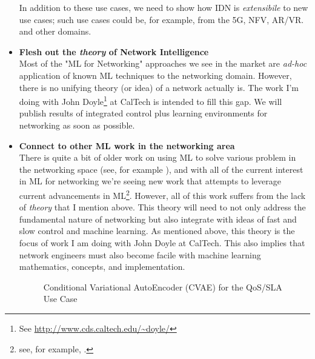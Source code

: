 \documentclass[11pt, oneside]{article}   	%
\begin{document}
\begin{itemize}
\bigskip
\noindent
In addition to these use cases, we need to show how IDN is \emph{extensibile} to new use cases; such use cases could be, for example, from the 5G, NFV, AR/VR. and 
other domains.

\item \textbf{Flesh out the \emph{theory} of Network Intelligence} \\
Most of the "ML for Networking" approaches we see in the market are \emph{ad-hoc} application of known ML techniques to the networking domain. However, there is no unifying theory (or idea) of a network actually is. The work I'm doing with John Doyle\footnote{See \url{http://www.cds.caltech.edu/~doyle/}} at CalTech is intended to fill this gap. We will publish results of integrated control plus learning environments for networking as soon as possible.


\item \textbf{Connect to other ML work in the networking area} \\
There is quite a bit of older work on using ML to solve various problem in the networking space (see, for example  \cite{Tao:2001aa}), 
and with all of the current interest in ML for networking we're seeing new work that attempts to leverage current advancements 
in ML\footnote{see, for example, \cite{Stampa:2017aa}.}.  However, all of this work suffers from the lack of \emph{theory} that I mention above. This theory will need to not only address the fundamental nature of networking but also integrate with ideas of fast and slow control and machine learning. As mentioned above, this theory is the focus of work I am doing with John Doyle at CalTech. This also implies that network engineers must also become facile with machine learning mathematics, concepts, and
implementation.

\begin{figure}
\caption{Conditional Variational AutoEncoder (CVAE) for the QoS/SLA Use Case}
\label{fig:cvae}
\end{figure}


\end{itemize}
\end{document}
